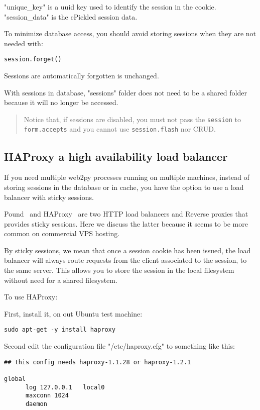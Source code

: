 \documentclass[justified,sixbynine,notoc]{tufte-book}
\def\ft{\small\tt}
\def\inxx#1{\index{#1}}
\begin{document}
\begin{fullwidth}
"unique\_key" is a uuid key used to identify the session in the cookie.
"session\_data" is the cPickled session data.

To minimize database access, you should avoid storing sessions when they are not needed with:
\begin{lstlisting}
session.forget()
\end{lstlisting}

Sessions are automatically forgotten is unchanged.

With sessions in database, "sessions" folder does not need to be a shared folder because it will no longer be accessed.

\begin{quote}Notice that, if sessions are disabled, you must not pass the {\ft session} to {\ft form.accepts} and you cannot use {\ft session.flash} nor CRUD.\end{quote}
\goodbreak\subsection{HAProxy a high availability load balancer}

\inxx{HAProxy}

If you need multiple web2py processes running on multiple machines, instead of storing sessions in the database or in cache, you have the option to use a load balancer with sticky sessions.

Pound~\cite{pound}  and HAProxy~\cite{haproxy}  are two HTTP load balancers and Reverse proxies that provides sticky sessions. Here we discuss the latter because it seems to be more common on commercial VPS hosting.

By sticky sessions, we mean that once a session cookie has been issued, the load balancer will always route requests from the client associated to the session, to the same server. This allows you to store the session in the local filesystem without need for a shared filesystem.

To use HAProxy:

First, install it, on out Ubuntu test machine:
\begin{lstlisting}
sudo apt-get -y install haproxy
\end{lstlisting}

Second edit the configuration file "/etc/haproxy.cfg" to something like this:
\begin{lstlisting}
## this config needs haproxy-1.1.28 or haproxy-1.2.1

global
      log 127.0.0.1   local0
      maxconn 1024
      daemon


\end{lstlisting}
\end{fullwidth}
\end{document}
